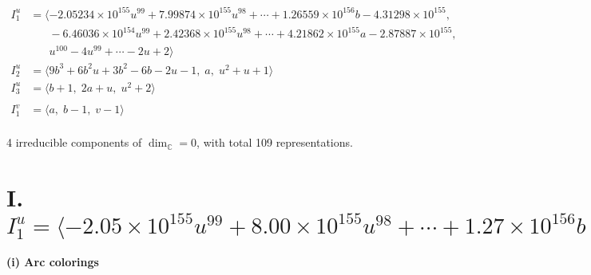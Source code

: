 \documentclass[1p]{elsarticle_modified}
\theoremstyle{definition}
\begin{document}
\begin{align*}
I^u_{1}&=\langle 
-2.05234\times10^{155} u^{99}+7.99874\times10^{155} u^{98}+\cdots+1.26559\times10^{156} b-4.31298\times10^{155},\\
\phantom{I^u_{1}}&\phantom{= \langle  }-6.46036\times10^{154} u^{99}+2.42368\times10^{155} u^{98}+\cdots+4.21862\times10^{155} a-2.87887\times10^{155},\\
\phantom{I^u_{1}}&\phantom{= \langle  }u^{100}-4 u^{99}+\cdots-2 u+2\rangle \\
I^u_{2}&=\langle 
9 b^3+6 b^2 u+3 b^2-6 b-2 u-1,\;a,\;u^2+u+1\rangle \\
I^u_{3}&=\langle 
b+1,\;2 a+u,\;u^2+2\rangle \\
\\
I^v_{1}&=\langle 
a,\;b-1,\;v-1\rangle \\
\end{align*}
\raggedright * 4 irreducible components of $\dim_{\mathbb{C}}=0$, with total 109 representations.\\
\newpage
\renewcommand{\arraystretch}{1}
\centering \section*{I. $I^u_{1}= \langle -2.05\times10^{155} u^{99}+8.00\times10^{155} u^{98}+\cdots+1.27\times10^{156} b-4.31\times10^{155},\;-6.46\times10^{154} u^{99}+2.42\times10^{155} u^{98}+\cdots+4.22\times10^{155} a-2.88\times10^{155},\;u^{100}-4 u^{99}+\cdots-2 u+2 \rangle$}
\flushleft \textbf{(i) Arc colorings}\\
\end{document}
